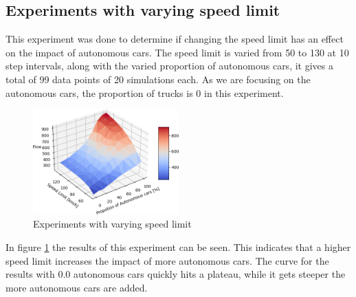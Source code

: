 \subsection{Experiments with varying speed limit}
This experiment was done to determine if changing the speed limit has an effect on the impact of autonomous cars. The speed limit is varied from 50 to 130 at 10 step intervals, along with the varied proportion of autonomous cars, it gives a total of 99 data points of 20 simulations each.  As we are focusing on the autonomous cars, the proportion of trucks is 0 in this experiment.
\begin{figure}[H]
    \centering
    \includegraphics[width=0.5\textwidth]{images/Experiment3.png}
    \caption{Experiments with varying speed limit}
    \label{fig:experiment3}
\end{figure}
In figure \ref{fig:experiment3} the results of this experiment can be seen. This indicates that a higher speed limit increases the impact of more autonomous cars. The curve for the results with 0.0 autonomous cars quickly hits a plateau, while it gets steeper the more autonomous cars are added. 

